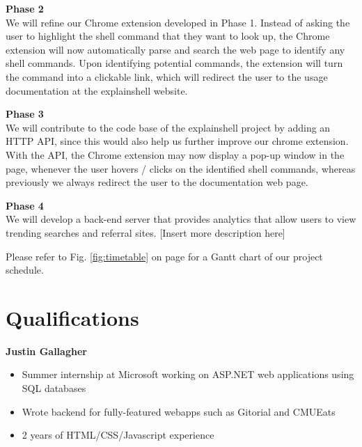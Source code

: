 \documentclass[11pt]{article}
\begin{document}
\par{\bf Phase 2}\\
We will refine our Chrome extension developed in Phase 1. Instead of asking the user to highlight the shell command that they want to look up, the Chrome extension will now automatically parse and search the web page to identify any shell commands. Upon identifying potential commands, the extension will turn the command into a clickable link, which will redirect the user to the usage documentation at the explainshell website.

\par{\bf Phase 3}\\
We will contribute to the code base of the explainshell project by adding an HTTP API, since this would also help us further improve our chrome extension. With the API, the Chrome extension may now display a pop-up window in the page, whenever the user hovers / clicks on the identified shell commands, whereas previously we always redirect the user to the documentation web page.

\par{\bf Phase 4}\\
We will develop a back-end server that provides analytics that allow users to view trending searches and referral sites. [Insert more description here]

Please refer to Fig. \ref{fig:timetable} on page \pageref{fig:timetable} for a Gantt chart of our project schedule.

\section{Qualifications}
\par{\bf Justin Gallagher} 
\begin{itemize}
	\item Summer internship at Microsoft working on ASP.NET web applications using SQL databases
	\item Wrote backend for fully-featured webapps such as Gitorial and CMUEats
	\item 2 years of HTML/CSS/Javascript experience
\end{itemize}
\end{document}
